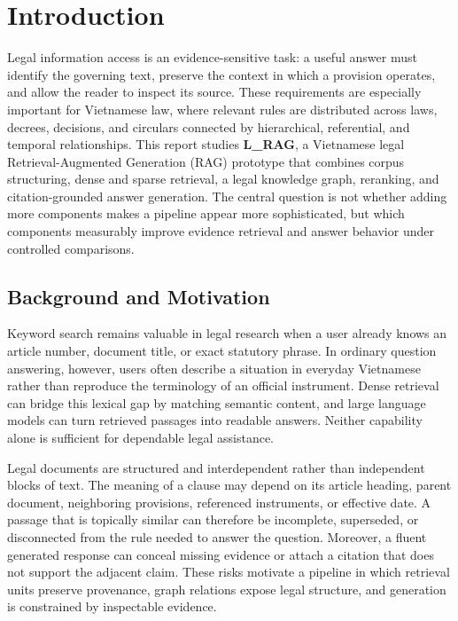 \section{Introduction}
\label{sec:introduction}

Legal information access is an evidence-sensitive task: a useful answer must
identify the governing text, preserve the context in which a provision
operates, and allow the reader to inspect its source. These requirements are
especially important for Vietnamese law, where relevant rules are distributed
across laws, decrees, decisions, and circulars connected by hierarchical,
referential, and temporal relationships. This report studies \textbf{L\_RAG},
a Vietnamese legal Retrieval-Augmented Generation (RAG) prototype that
combines corpus structuring, dense and sparse retrieval, a legal knowledge
graph, reranking, and citation-grounded answer generation. The central
question is not whether adding more components makes a pipeline appear more
sophisticated, but which components measurably improve evidence retrieval and
answer behavior under controlled comparisons.

\subsection{Background and Motivation}
\label{sec:background-motivation}

Keyword search remains valuable in legal research when a user already knows
an article number, document title, or exact statutory phrase. In ordinary
question answering, however, users often describe a situation in everyday
Vietnamese rather than reproduce the terminology of an official instrument.
Dense retrieval can bridge this lexical gap by matching semantic content, and
large language models can turn retrieved passages into readable answers.
Neither capability alone is sufficient for dependable legal assistance.

Legal documents are structured and interdependent rather than independent
blocks of text. The meaning of a clause may depend on its article heading,
parent document, neighboring provisions, referenced instruments, or effective
date. A passage that is topically similar can therefore be incomplete,
superseded, or disconnected from the rule needed to answer the question.
Moreover, a fluent generated response can conceal missing evidence or attach
a citation that does not support the adjacent claim. These risks motivate a
pipeline in which retrieval units preserve provenance, graph relations expose
legal structure, and generation is constrained by inspectable evidence.

